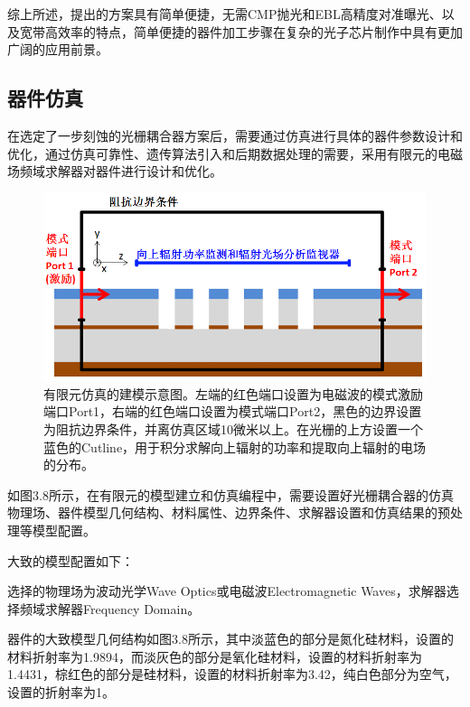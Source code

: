 综上所述，提出的方案具有简单便捷，无需CMP抛光和EBL高精度对准曝光、以及宽带高效率的特点，简单便捷的器件加工步骤在复杂的光子芯片制作中具有更加广阔的应用前景。

\subsection{器件仿真}

在选定了一步刻蚀的光栅耦合器方案后，需要通过仿真进行具体的器件参数设计和优化，通过仿真可靠性、遗传算法引入和后期数据处理的需要，采用有限元的电磁场频域求解器对器件进行设计和优化。\cite{Bathe2000Finite}

\begin{figure}[!htbp]
    \centering
    \includegraphics[width=1\textwidth]{Img/3-8.png}
    \caption{有限元仿真的建模示意图。左端的红色端口设置为电磁波的模式激励端口Port1，右端的红色端口设置为模式端口Port2，黑色的边界设置为阻抗边界条件，并离仿真区域10微米以上。在光栅的上方设置一个蓝色的Cutline，用于积分求解向上辐射的功率和提取向上辐射的电场的分布。}
    \label{fig:3-8}
\end{figure}

如图3.8所示，在有限元的模型建立和仿真编程中，需要设置好光栅耦合器的仿真物理场、器件模型几何结构、材料属性、边界条件、求解器设置和仿真结果的预处理等模型配置。
 
大致的模型配置如下：

选择的物理场为波动光学Wave Optics或电磁波Electromagnetic Waves，求解器选择频域求解器Frequency Domain。

器件的大致模型几何结构如图3.8所示，其中淡蓝色的部分是氮化硅材料，设置的材料折射率为1.9894，而淡灰色的部分是氧化硅材料，设置的材料折射率为1.4431，棕红色的部分是硅材料，设置的材料折射率为3.42，纯白色部分为空气，设置的折射率为1。

